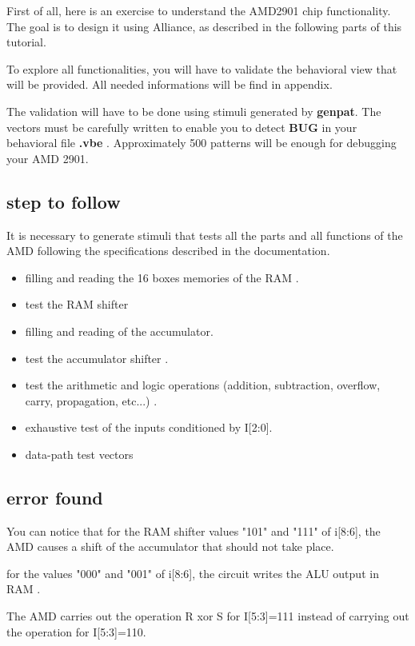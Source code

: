 \documentclass[12pt]{article}
\begin{document}
{First of all, here is an exercise to understand the AMD2901
chip functionality. The goal is to design it 
using Alliance, as described in the following parts of
this tutorial.

To explore all functionalities, you will have
to validate the behavioral view that will be provided. 
All needed informations will be find in appendix.

The validation will have to be done using stimuli 
generated by {\bf genpat}. The vectors must be carefully written
to enable you to detect { \bf BUG } in your behavioral file { \bf .vbe }. 
Approximately 500 patterns will be enough for debugging your AMD 2901.

\subsection{step to follow}
It is necessary to generate stimuli that tests all the parts and all functions
of the AMD following the specifications described in the documentation.

\begin{itemize}\itemsep=-.8ex
\item   filling and reading the 16 boxes memories of the RAM .
\item   test the RAM shifter
\item   filling and reading of the accumulator.
\item   test the accumulator shifter .
\item   test the arithmetic and logic operations
        (addition, subtraction, overflow, carry, propagation, etc...) .
\item   exhaustive test of the inputs conditioned by I[2:0].
\item   data-path test vectors
\end{itemize}

\subsection{error found}

You can notice that for the RAM shifter values "101" and "111" of
i[8:6], the AMD causes a shift of the accumulator that should not
take place.

for the values "000" and "001" of i[8:6], the circuit writes the
ALU output in RAM .

The AMD carries out the operation R xor S for
I[5:3]=111 instead of carrying out the operation for I[5:3]=110.

}
\end{document}
